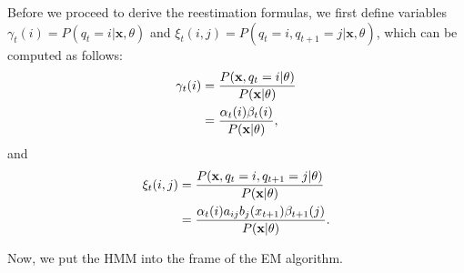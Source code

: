 \documentclass[12pt,final,twoside]{report}
\theoremstyle{plain}
\theoremstyle{definition}
\theoremstyle{remark}
\begin{document}
Before we proceed to derive the reestimation formulas, we first define variables $\gamma_t(i) = P(q_t=i|\mathbf{x},\theta)$ and $\xi_t(i,j) = P(q_t=i,q_{t+1}=j|\mathbf{x},\theta)$, which can be computed as follows:
\begin{align}
  \gamma_t(i) &= \frac{P(\mathbf{x},q_t=i|\theta)}{P(\mathbf{x}|\theta)} \notag\\
  &= \frac{\alpha_t(i)\beta_t(i)}{P(\mathbf{x}|\theta)} ,
  \label{eq:hmmgamma}
\end{align}
and
\begin{align}
  \xi_t(i,j) &= \frac{P(\mathbf{x},q_t=i,q_{t+1}=j|\theta)}{P(\mathbf{x}|\theta)} \notag\\
  &=  \frac{\alpha_t(i)a_{ij}b_j(x_{t+1})\beta_{t+1}(j)}{P(\mathbf{x}|\theta)} .
  \label{eq:hmmxi}
\end{align}

Now, we put the HMM into the frame of the EM algorithm.
\end{document}
